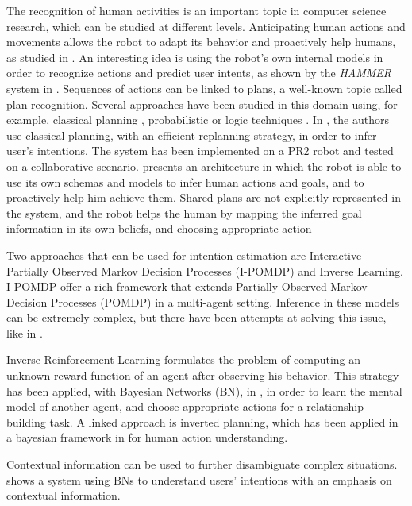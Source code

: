 The recognition of human activities is an important topic in computer science research, which can be studied at different levels. Anticipating human actions and movements allows the robot to adapt its behavior and proactively help humans, as studied in \cite{koppula2013anticipating}. An interesting idea is using the robot's own internal models in order to recognize actions and predict user intents, as shown by the \textit{HAMMER} system in \cite{demiris2007prediction}. Sequences of actions can be linked to plans, a well-known topic called plan recognition. Several approaches have been studied in this domain using, for example, classical planning \cite{ramirez2009plan}, probabilistic \cite{bui2003general} or logic techniques \cite{singla2011abductive}.  In \cite{talamadupula2014coordination}, the authors use classical planning, with an efficient replanning strategy, in order to infer user's intentions. The system has been implemented on a PR2 robot and tested on a collaborative scenario. \cite{breazeal2009embodied} presents an architecture in which the robot is able to use its own schemas and models to infer human actions and goals, and to proactively help him achieve them. Shared plans are not explicitly represented in the system, and the robot helps the human by mapping the inferred goal information in its own beliefs, and choosing appropriate action

Two approaches that can be used for intention estimation are Interactive Partially Observed Markov Decision Processes (I-POMDP) and Inverse Learning. I-POMDP  \cite{gmytrasiewicz2004interactive} offer a rich framework that extends Partially Observed Markov Decision Processes (POMDP) in a multi-agent setting. Inference in these models can be extremely complex, but there have been attempts at solving this issue, like in \cite{doshi2009monte,hoang2013interactive}. 

Inverse Reinforcement Learning \cite{ng2000algorithms} formulates the problem of computing an unknown reward function of an agent after observing his behavior. This strategy has been applied, with Bayesian Networks (BN), in \cite{Nagai2015}, in order to learn the mental model of another agent, and choose appropriate actions for a relationship building task. A linked approach is inverted planning, which has been applied in a bayesian framework in \cite{baker2009action}  for human action understanding.

Contextual information can be used to further disambiguate complex situations. \cite{Liu2014} shows a system using BNs to understand users' intentions with an emphasis on contextual information.

